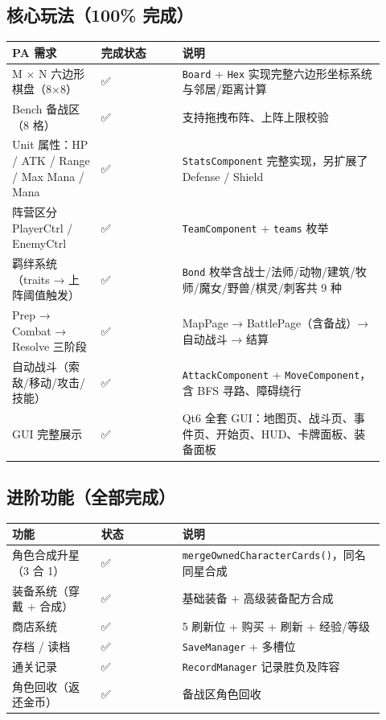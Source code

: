 \documentclass[UTF8,10pt]{ctexart}
\begin{document}
\subsection*{核心玩法（100\% 完成）}

{\small
\begin{longtable}{p{0.22\linewidth}p{0.20\linewidth}p{0.50\linewidth}}
\toprule
\textbf{PA 需求} & \textbf{完成状态} & \textbf{说明} \\
\midrule
M × N 六边形棋盘（8×8） & {\symbolfont ✅} & \texttt{Board} + \texttt{Hex} 实现完整六边形坐标系统与邻居/距离计算 \\
Bench 备战区（8 格） & {\symbolfont ✅} & 支持拖拽布阵、上阵上限校验 \\
Unit 属性：HP / ATK / Range / Max Mana / Mana & {\symbolfont ✅} & \texttt{StatsComponent} 完整实现，另扩展了 Defense / Shield \\
阵营区分 PlayerCtrl / EnemyCtrl & {\symbolfont ✅} & \texttt{TeamComponent} + \texttt{teams} 枚举 \\
羁绊系统（traits → 上阵阈值触发） & {\symbolfont ✅} & \texttt{Bond} 枚举含战士/法师/动物/建筑/牧师/魔女/野兽/棋灵/刺客共 9 种 \\
Prep → Combat → Resolve 三阶段 & {\symbolfont ✅} & MapPage → BattlePage（含备战）→ 自动战斗 → 结算 \\
自动战斗（索敌/移动/攻击/技能） & {\symbolfont ✅} & \texttt{AttackComponent} + \texttt{MoveComponent}，含 BFS 寻路、障碍绕行 \\
GUI 完整展示 & {\symbolfont ✅} & Qt6 全套 GUI：地图页、战斗页、事件页、开始页、HUD、卡牌面板、装备面板 \\
\bottomrule
\end{longtable}
}

\subsection*{进阶功能（全部完成）}

{\small
\begin{longtable}{p{0.22\linewidth}p{0.20\linewidth}p{0.50\linewidth}}
\toprule
\textbf{功能} & \textbf{状态} & \textbf{说明} \\
\midrule
角色合成升星（3 合 1） & {\symbolfont ✅} & \texttt{mergeOwnedCharacterCards()}，同名同星合成 \\
装备系统（穿戴 + 合成） & {\symbolfont ✅} & 基础装备 + 高级装备配方合成 \\
商店系统 & {\symbolfont ✅} & 5 刷新位 + 购买 + 刷新 + 经验/等级 \\
存档 / 读档 & {\symbolfont ✅} & \texttt{SaveManager} + 多槽位 \\
通关记录 & {\symbolfont ✅} & \texttt{RecordManager} 记录胜负及阵容 \\
角色回收（返还金币） & {\symbolfont ✅} & 备战区角色回收 \\
\bottomrule
\end{longtable}
}
\end{document}
